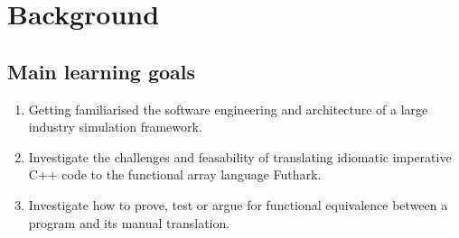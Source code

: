 \section{Background}
\subsection*{Main learning goals}
\begin{enumerate}
\item Getting familiarised the software engineering and architecture of a large industry simulation framework.
\item Investigate the challenges and feasability of translating idiomatic imperative C++ code to the functional array language Futhark.
\item Investigate how to prove, test or argue for functional equivalence between a program and its manual translation.
\end{enumerate}
